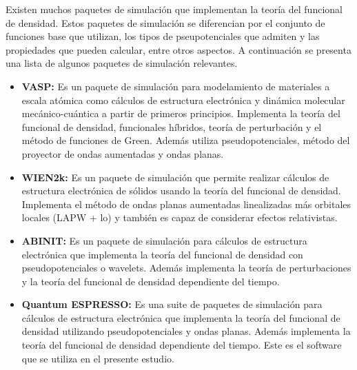 Existen muchos paquetes de simulaci\'on que implementan la teor\'ia del 
funcional de densidad. Estos paquetes de simulaci\'on se diferencian por el 
conjunto de funciones base que utilizan, los tipos de pseupotenciales que 
admiten y las propiedades que pueden calcular, entre otros aspectos. A 
continuaci\'on se presenta una lista de algunos paquetes de simulaci\'on 
relevantes.

\begin{itemize}
    \item \textbf{VASP:}  Es un paquete de simulaci\'on para modelamiento de 
    materiales a escala at\'omica como c\'alculos de estructura electr\'onica y 
    din\'amica molecular mec\'anico-cu\'antica a partir de primeros principios. 
    Implementa la teor\'ia del funcional de densidad, funcionales h\'ibridos, 
    teor\'ia de perturbaci\'on y el m\'etodo de funciones de Green. Adem\'as 
    utiliza pseudopotenciales, m\'etodo del proyector de ondas aumentadas y 
    ondas planas.
    \item \textbf{WIEN2k:} Es un paquete de simulaci\'on que permite realizar 
    c\'alculos de estructura electr\'onica de s\'olidos usando la teor\'ia del 
    funcional de densidad. Implementa el m\'etodo de ondas planas aumentadas 
    linealizadas m\'as orbitales locales (LAPW + lo) y tambi\'en es capaz de 
    considerar efectos relativistas.
    \item \textbf{ABINIT:} Es un paquete de simulaci\'on para c\'alculos de 
    estructura electr\'onica que implementa la teor\'ia del funcional de 
    densidad con pseudopotenciales o wavelets. Adem\'as implementa la teor\'ia 
    de perturbaciones y la teor\'ia del funcional de densidad dependiente del 
    tiempo.
    \item \textbf{Quantum ESPRESSO:} Es una suite de paquetes de simulaci\'on 
    para c\'alculos de estructura electr\'onica que implementa la teor\'ia del 
    funcional de densidad utilizando pseudopotenciales y ondas planas. Adem\'as 
    implementa la teor\'ia del funcional de densidad dependiente del tiempo. 
    Este es el software que se utiliza en el presente estudio.
\end{itemize}
